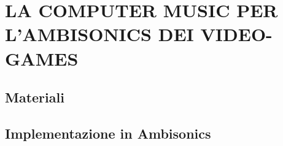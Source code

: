 
\chapter{LA COMPUTER MUSIC PER L'AMBISONICS DEI VIDEO-GAMES}
\label{chp:La Computer Music per Ambisonics dei Video-Games}

\section{Materiali}

\section{Implementazione in Ambisonics}